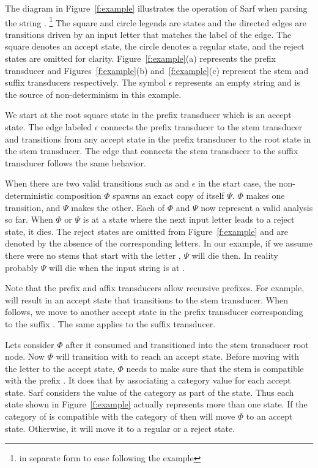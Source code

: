\documentclass[11pt]{article}
\begin{document}
The diagram in Figure~\ref{f:example}
illustrates the operation of Sarf when parsing the
string .
\footnote{ 
%
in separate form to ease following the example
}
The square and circle legends are states 
and the directed edges are transitions driven by an input
letter that matches the label of the edge. 
The square denotes an accept state, 
the circle denotes a regular state, and the reject states
are omitted for clarity. 
Figure~\ref{f:example}(a) represents the prefix transducer and 
Figures~\ref{f:example}(b) and~\ref{f:example}(c) represent the 
stem and suffix transducers respectively. 
The symbol $\epsilon$ represents an empty string and is 
the source of non-determinism in this example. 

We start at the root square state in the prefix transducer
which is an accept state. 
The edge labeled $\epsilon$ connects the prefix 
transducer to the stem transducer and transitions from any accept state
in the prefix transducer to the root state in the stem transducer.
The edge that connects the stem transducer to the suffix transducer
follows the same behavior. 

When there are two valid transitions such as  
and $\epsilon$ in the start case, the non-deterministic 
composition $\Phi$ spawns an exact copy of itself $\Psi$. 
$\Phi$ makes one transition, and $\Psi$ makes the other. 
Each of $\Phi$ and $\Psi$ now represent a valid analysis so far. 
When $\Phi$ or $\Psi$ is at a state where the next input letter
leads to a reject state, it dies.
The reject states are omitted from Figure~\ref{f:example}
and are denoted by the absence of the corresponding 
letters. 
In our example, if we assume there were no stems that start 
with the letter , $\Psi$ will die then. 
In reality probably $\Psi$ will die when the input string
is at . 

Note that the prefix and affix transducers allow recursive 
prefixes. For example,  will result in an accept state
that transitions to the stem transducer. 
When  follows, we move to another accept state in the 
prefix transducer corresponding to the suffix . 
The same applies to the suffix transducer. 

Lets consider $\Phi$ after it consumed  
and transitioned into the stem transducer root node. 
Now $\Phi$ will transition with  to reach an accept 
state. 
Before moving with the letter  to the accept state,
$\Phi$ needs to make sure that the stem  is compatible
with the prefix . 
It does that by associating a category value for each accept state. 
Sarf considers the value of the category as part of the state.
Thus each state shown in Figure~\ref{f:example} actually represents
more than one state. 
If the category of  is compatible with the category of
 then  will move $\Phi$ to an accept state. 
Otherwise, it will move it to a regular or a reject state. 
\end{document}
